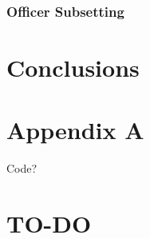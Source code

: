 \documentclass[12pt,letterpaper,toc=flat,oneside]{report}
\theoremstyle{definition}
\theoremstyle{definition}
\theoremstyle{definition}
\theoremstyle{remark}
\begin{document}
\hypertarget{officer-subsetting}{%
\subsection{Officer Subsetting}\label{officer-subsetting}}

\newpage

\hypertarget{conclusions}{%
\chapter{Conclusions}\label{conclusions}}

\hypertarget{appendix-a}{%
\chapter*{Appendix A}\label{appendix-a}}

Code?

\hypertarget{to-do}{%
\chapter{TO-DO}\label{to-do}}
\end{document}
